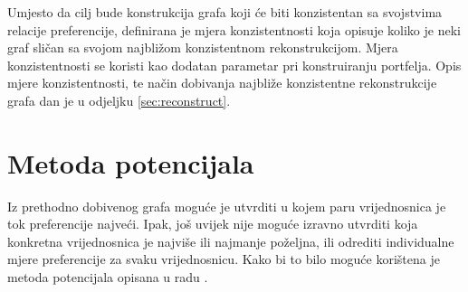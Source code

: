 \documentclass[lmodern, utf8, diplomski, numeric]{fer}
\newcommand{\graph}[1]{\mathcal{#1}}
\begin{document}
  Umjesto da cilj bude konstrukcija grafa koji će biti konzistentan sa svojstvima relacije preferencije, definirana je mjera konzistentnosti koja opisuje koliko je neki graf sličan sa svojom najbližom konzistentnom rekonstrukcijom.
  Mjera konzistentnosti se koristi kao dodatan parametar pri konstruiranju portfelja.
  Opis mjere konzistentnosti, te način dobivanja najbliže konzistentne rekonstrukcije grafa dan je u odjeljku \ref{sec:reconstruct}.
  
  
  

  \section{Metoda potencijala}
  \label{sec:metpot}
  Iz prethodno dobivenog grafa moguće je utvrditi u kojem paru vrijednosnica je tok preferencije najveći.
  Ipak, još uvijek nije moguće izravno utvrditi koja konkretna vrijednosnica je najviše ili najmanje poželjna, ili odrediti individualne mjere preferencije za svaku vrijednosnicu.
  Kako bi to bilo moguće korištena je metoda potencijala opisana u radu \citep{potential}.
  
  
\end{document}
